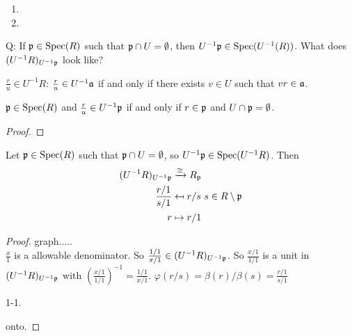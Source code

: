 \begin{example*}
    \begin{enumerate}
        \item 
        \item 
    \end{enumerate}
\end{example*}

Q: If $\mathfrak{p} \in \operatorname{Spec}(R)$ such that $\mathfrak{p} \cap U = \emptyset$, then $U^{-1}\mathfrak{p} \in \operatorname{Spec}(U^{-1}(R))$. What does $(U^{-1}R)_{U^{-1}\mathfrak{p}}$ look like?

\begin{recall*}
    $\frac{r}{u} \in U^{-1}R$: $\frac{r}{u} \in U^{-1}\mathfrak{a}$ if and only if there exists $v \in U$ such that $vr \in \mathfrak{a}$.
\end{recall*}

\begin{lemma}
    $\mathfrak{p} \in \operatorname{Spec}(R)$ and $\frac{r}{u} \in U^{-1}\mathfrak{p}$ if and only if $r \in \mathfrak{p}$ and $U \cap \mathfrak{p} = \emptyset$.
\end{lemma}

\begin{proof}

\end{proof}

\begin{proposition}
    Let $\mathfrak{p} \in \operatorname{Spec}(R)$ such that $\mathfrak{p} \cap U = \emptyset$, so $U^{-1}\mathfrak{p} \in \operatorname{Spec}(U^{-1}R)$. Then 
    \begin{align*}
        (U^{-1}R)_{U^{-1}\mathfrak{p}} &\xrightarrow \cong R_{\mathfrak{p}} \\
        \frac{r/1}{s/1} &\mapsfrom r/s \ s \in R \setminus \mathfrak{p} \\
        r &\mapsto r/1
    \end{align*}
\end{proposition}

\begin{proof}
    graph..... \\
    $\frac{x}{1}$ is a allowable denominator. So $\frac{1/1}{x/1} \in (U^{-1}R)_{U^{-1}\mathfrak{p}}$. So $\frac{x/1}{1/1}$ is a unit in $(U^{-1}R)_{U^{-1}\mathfrak{p}}$ with $(\frac{x/1}{1/1})^{-1} = \frac{1/1}{x/1}$. $\varphi(r/s) = \beta(r)/\beta(s) = \frac{r/1}{s/1}$ \par 
    1-1. \par 
    onto. \par 
\end{proof}

